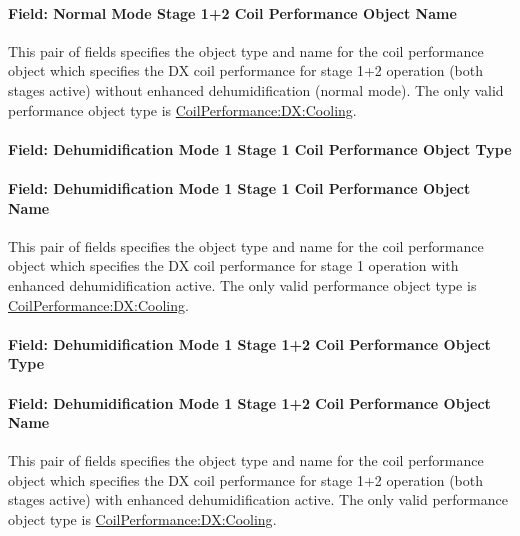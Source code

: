 \paragraph{Field: Normal Mode Stage 1+2 Coil Performance Object Name}\label{field-normal-mode-stage-12-coil-performance-object-name}

This pair of fields specifies the object type and name for the coil performance object which specifies the DX coil performance for stage 1+2 operation (both stages active) without enhanced dehumidification (normal mode). The only valid performance object type is \hyperref[coilperformancedxcooling]{CoilPerformance:DX:Cooling}.

\paragraph{Field: Dehumidification Mode 1 Stage 1 Coil Performance Object Type}\label{field-dehumidification-mode-1-stage-1-coil-performance-object-type}

\paragraph{Field: Dehumidification Mode 1 Stage 1 Coil Performance Object Name}\label{field-dehumidification-mode-1-stage-1-coil-performance-object-name}

This pair of fields specifies the object type and name for the coil performance object which specifies the DX coil performance for stage 1 operation with enhanced dehumidification active. The only valid performance object type is \hyperref[coilperformancedxcooling]{CoilPerformance:DX:Cooling}.

\paragraph{Field: Dehumidification Mode 1 Stage 1+2 Coil Performance Object Type}\label{field-dehumidification-mode-1-stage-12-coil-performance-object-type}

\paragraph{Field: Dehumidification Mode 1 Stage 1+2 Coil Performance Object Name}\label{field-dehumidification-mode-1-stage-12-coil-performance-object-name}

This pair of fields specifies the object type and name for the coil performance object which specifies the DX coil performance for stage 1+2 operation (both stages active) with enhanced dehumidification active. The only valid performance object type is \hyperref[coilperformancedxcooling]{CoilPerformance:DX:Cooling}.

